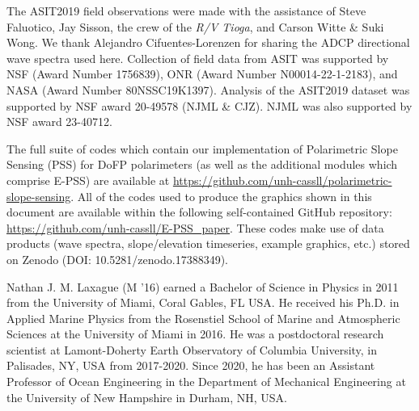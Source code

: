 \documentclass[letterpaper,journal]{IEEEtran}
\begin{document}
The ASIT2019 field observations were made with the assistance of Steve Faluotico, Jay Sisson, the crew of the \textit{R/V Tioga}, and Carson Witte \& Suki Wong. We thank Alejandro Cifuentes-Lorenzen for sharing the ADCP directional wave spectra used here. Collection of field data from ASIT was supported by NSF (Award Number 1756839), ONR (Award Number N00014-22-1-2183), and NASA (Award Number 80NSSC19K1397). Analysis of the ASIT2019 dataset was supported by NSF award 20-49578 (NJML \& CJZ). NJML was also supported by NSF award 23-40712.

The full suite of codes which contain our implementation of Polarimetric Slope Sensing (PSS) for DoFP polarimeters (as well as the additional modules which comprise E-PSS) are available at \url{https://github.com/unh-cassll/polarimetric-slope-sensing}. All of the codes used to produce the graphics shown in this document are available within the following self-contained GitHub repository: \url{https://github.com/unh-cassll/E-PSS_paper}. These codes make use of data products (wave spectra, slope/elevation timeseries, example graphics, etc.) stored on Zenodo (DOI: 10.5281/zenodo.17388349).






\begin{IEEEbiography}{Nathan J. M. Laxague}
(M '16) earned a Bachelor of Science in Physics in 2011 from the University of Miami, Coral Gables, FL USA. He received his Ph.D. in Applied Marine Physics from the Rosenstiel School of Marine and Atmospheric Sciences at the University of Miami in 2016. He was a postdoctoral research scientist at Lamont-Doherty Earth Observatory of Columbia University, in Palisades, NY, USA from 2017-2020. Since 2020, he has been an Assistant Professor of Ocean Engineering in the Department of Mechanical Engineering at the University of New Hampshire in Durham, NH, USA.
\end{IEEEbiography}
\end{document}
